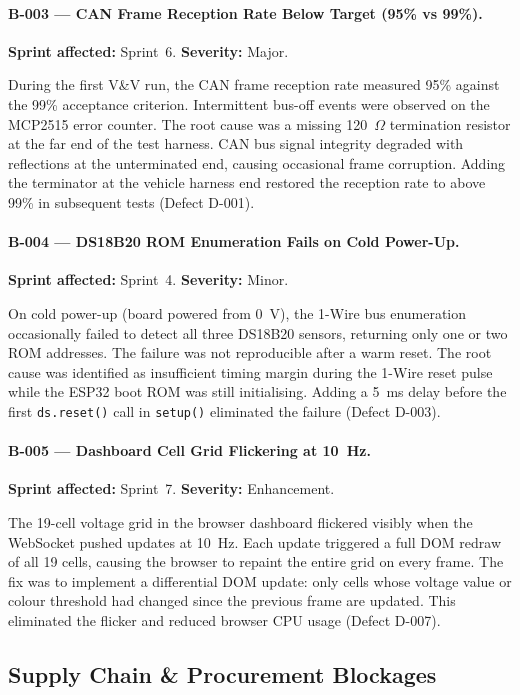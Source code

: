\paragraph{B-003 --- CAN Frame Reception Rate Below Target (95\% vs 99\%).}
\textbf{Sprint affected:} Sprint~6. \textbf{Severity:} Major.

During the first V\&V run, the CAN frame reception rate measured 95\% against the 99\% acceptance criterion. Intermittent bus-off events were observed on the MCP2515 error counter. The root cause was a missing 120~$\Omega$ termination resistor at the far end of the test harness. CAN bus signal integrity degraded with reflections at the unterminated end, causing occasional frame corruption. Adding the terminator at the vehicle harness end restored the reception rate to above 99\% in subsequent tests (Defect D-001).

\paragraph{B-004 --- DS18B20 ROM Enumeration Fails on Cold Power-Up.}
\textbf{Sprint affected:} Sprint~4. \textbf{Severity:} Minor.

On cold power-up (board powered from 0~V), the 1-Wire bus enumeration occasionally failed to detect all three DS18B20 sensors, returning only one or two ROM addresses. The failure was not reproducible after a warm reset. The root cause was identified as insufficient timing margin during the 1-Wire reset pulse while the ESP32 boot ROM was still initialising. Adding a 5~ms delay before the first \texttt{ds.reset()} call in \texttt{setup()} eliminated the failure (Defect D-003).

\paragraph{B-005 --- Dashboard Cell Grid Flickering at 10~Hz.}
\textbf{Sprint affected:} Sprint~7. \textbf{Severity:} Enhancement.

The 19-cell voltage grid in the browser dashboard flickered visibly when the WebSocket pushed updates at 10~Hz. Each update triggered a full DOM redraw of all 19 cells, causing the browser to repaint the entire grid on every frame. The fix was to implement a differential DOM update: only cells whose voltage value or colour threshold had changed since the previous frame are updated. This eliminated the flicker and reduced browser CPU usage (Defect D-007).

\subsection{Supply Chain \& Procurement Blockages}

